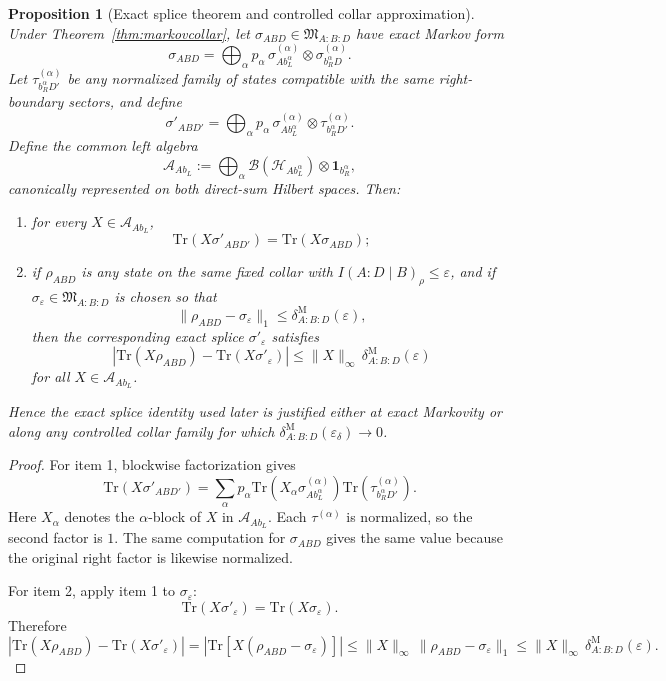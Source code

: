 \documentclass[11pt]{article}
\newtheorem{proposition}[theorem]{Proposition}
\begin{document}
\begin{proposition}[Exact splice theorem and controlled collar approximation]\label{prop:splice}
Under Theorem~\ref{thm:markovcollar}, let \(\sigma_{ABD}\in \mathfrak M_{A:B:D}\) have exact Markov form
\[
\sigma_{ABD}
=
\bigoplus_\alpha p_\alpha\,
\sigma^{(\alpha)}_{A b_L^\alpha}\otimes \sigma^{(\alpha)}_{b_R^\alpha D}.
\]
Let \(\tau^{(\alpha)}_{b_R^\alpha D'}\) be any normalized family of states compatible with the same right-boundary sectors, and define
\[
\sigma'_{AB D'}
=
\bigoplus_\alpha p_\alpha\,
\sigma^{(\alpha)}_{A b_L^\alpha}\otimes \tau^{(\alpha)}_{b_R^\alpha D'}.
\]
Define the common left algebra
\[
\mathcal A_{A b_L}:=
\bigoplus_\alpha \mathcal B(\mathcal H_{A b_L^\alpha})\otimes \mathbf 1_{b_R^\alpha},
\]
canonically represented on both direct-sum Hilbert spaces. Then:
\begin{enumerate}[leftmargin=2em]
\item for every \(X\in\mathcal A_{A b_L}\),
\[
\mathrm{Tr}(X\sigma'_{AB D'})=\mathrm{Tr}(X\sigma_{ABD});
\]
\item if \(\rho_{ABD}\) is any state on the same fixed collar with \(I(A:D\mid B)_\rho\le \varepsilon\), and if \(\sigma_\varepsilon\in\mathfrak M_{A:B:D}\) is chosen so that
\[
\|\rho_{ABD}-\sigma_\varepsilon\|_1
\le
\delta^{\mathrm M}_{A:B:D}(\varepsilon),
\]
then the corresponding exact splice \(\sigma'_{\varepsilon}\) satisfies
\[
\left|
\mathrm{Tr}(X\rho_{ABD})-\mathrm{Tr}(X\sigma'_{\varepsilon})
\right|
\le
\|X\|_\infty\,\delta^{\mathrm M}_{A:B:D}(\varepsilon)
\]
for all \(X\in\mathcal A_{A b_L}\).
\end{enumerate}
Hence the exact splice identity used later is justified either at exact Markovity or along any controlled collar family for which \(\delta^{\mathrm M}_{A:B:D}(\varepsilon_\delta)\to 0\).
\end{proposition}

\begin{proof}
For item 1, blockwise factorization gives
\[
\mathrm{Tr}(X\sigma'_{AB D'})
=
\sum_\alpha p_\alpha
\mathrm{Tr}\!\left(X_\alpha\sigma^{(\alpha)}_{A b_L^\alpha}\right)
\mathrm{Tr}\!\left(\tau^{(\alpha)}_{b_R^\alpha D'}\right).
\]
Here \(X_\alpha\) denotes the \(\alpha\)-block of \(X\) in \(\mathcal A_{A b_L}\). Each \(\tau^{(\alpha)}\) is normalized, so the second factor is \(1\). The same computation for \(\sigma_{ABD}\) gives the same value because the original right factor is likewise normalized.

For item 2, apply item 1 to \(\sigma_\varepsilon\):
\[
\mathrm{Tr}(X\sigma'_{\varepsilon})=\mathrm{Tr}(X\sigma_{\varepsilon}).
\]
Therefore
\[
\left|
\mathrm{Tr}(X\rho_{ABD})-\mathrm{Tr}(X\sigma'_{\varepsilon})
\right|
=
\left|
\mathrm{Tr}\!\left[X(\rho_{ABD}-\sigma_{\varepsilon})\right]
\right|
\le
\|X\|_\infty\,\|\rho_{ABD}-\sigma_{\varepsilon}\|_1
\le
\|X\|_\infty\,\delta^{\mathrm M}_{A:B:D}(\varepsilon).
\]
\end{proof}
\end{document}
